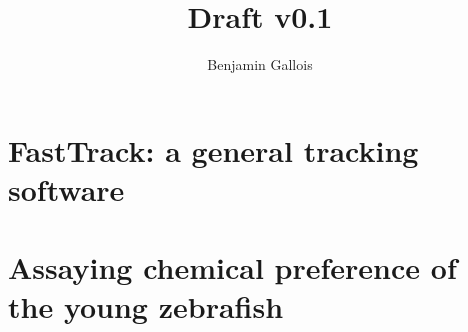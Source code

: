 \documentclass[11pt,a4paper]{report}
\title{Draft v0.1}
\author{Benjamin Gallois}
\begin{document}






\tableofcontents

\part{FastTrack: a general tracking software}


\part{Assaying chemical preference of the young zebrafish}




\end{document}
